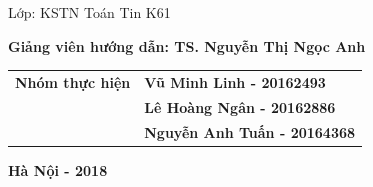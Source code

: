 \begin{titlepage}
\centerline{Lớp: KSTN Toán Tin K61}

\vspace*{1.25cm}
\centerline{\bf Giảng  viên hướng dẫn: TS. Nguyễn Thị Ngọc Anh}


\begin{center}
	\begin{tabular}{ll}
		\bf Nhóm thực hiện & \bf Vũ Minh Linh - 20162493 \\ 
		& \bf Lê Hoàng Ngân - 20162886\\ 
		& \bf Nguyễn Anh Tuấn - 20164368\\ 
	\end{tabular} 
\end{center}







\vfill
\centerline{\bf Hà Nội - 2018}
\end{titlepage}